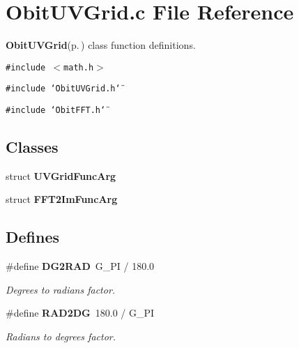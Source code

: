 \section{Obit\-UVGrid.c File Reference}
\label{ObitUVGrid_8c}
{\bf Obit\-UVGrid}{\rm (p.\,\pageref{structObitUVGrid})} class function definitions. 

{\tt \#include $<$math.h$>$}\par
{\tt \#include \char`\"{}Obit\-UVGrid.h\char`\"{}}\par
{\tt \#include \char`\"{}Obit\-FFT.h\char`\"{}}\par
\subsection*{Classes}
\begin{CompactItemize}
\item 
struct {\bf UVGrid\-Func\-Arg}
\item 
struct {\bf FFT2Im\-Func\-Arg}
\end{CompactItemize}
\subsection*{Defines}
\begin{CompactItemize}
\item 
\#define {\bf DG2RAD}\ G\_\-PI / 180.0
\begin{CompactList}\small\item\em Degrees to radians factor. \item\end{CompactList}\item 
\#define {\bf RAD2DG}\ 180.0 / G\_\-PI
\begin{CompactList}\small\item\em Radians to degrees factor. \item\end{CompactList}\end{CompactItemize}
